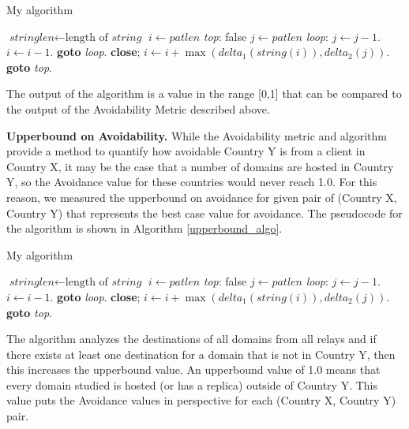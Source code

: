 \begin{algorithm}
\caption{My algorithm}\label{avoid_algo}
\begin{algorithmic}[1]
\State $\textit{stringlen} \gets \text{length of }\textit{string}$
\State $i \gets \textit{patlen}$
\BState \emph{top}:
 \Return false
\EndIf
\State $j \gets \textit{patlen}$
\BState \emph{loop}:
\State $j \gets j-1$.
\State $i \gets i-1$.
\State \textbf{goto} \emph{loop}.
\State \textbf{close};
\EndIf
\State $i \gets i+\max(\textit{delta}_1(\textit{string}(i)),\textit{delta}_2(j))$.
\State \textbf{goto} \emph{top}.
\EndProcedure
\end{algorithmic}
\end{algorithm}

The output of the algorithm is a value in the range [0,1] that can be compared to the output of the Avoidability Metric described above.  

{\bf Upperbound on Avoidability.}  While the Avoidability metric and algorithm provide a method to quantify how avoidable Country Y is from a client in Country X, it may be the case that a number of domains are hosted in Country Y, so the Avoidance value for these countries would never reach 1.0.  For this reason, we measured the upperbound on avoidance for given pair of (Country X, Country Y) that represents the best case value for avoidance.  The pseudocode for the algorithm is shown in Algorithm \ref{upperbound_algo}.

\begin{algorithm}
\caption{My algorithm}\label{upperbound_algo}
\begin{algorithmic}[1]
\State $\textit{stringlen} \gets \text{length of }\textit{string}$
\State $i \gets \textit{patlen}$
\BState \emph{top}:
 \Return false
\EndIf
\State $j \gets \textit{patlen}$
\BState \emph{loop}:
\State $j \gets j-1$.
\State $i \gets i-1$.
\State \textbf{goto} \emph{loop}.
\State \textbf{close};
\EndIf
\State $i \gets i+\max(\textit{delta}_1(\textit{string}(i)),\textit{delta}_2(j))$.
\State \textbf{goto} \emph{top}.
\EndProcedure
\end{algorithmic}
\end{algorithm}

The algorithm analyzes the destinations of all domains from all relays and if there exists at least one destination for a domain that is not in Country Y, then this increases the upperbound value.  An upperbound value of 1.0 means that every domain studied is hosted (or has a replica) outside of Country Y.  This value puts the Avoidance values in perspective for each (Country X, Country Y) pair.  


